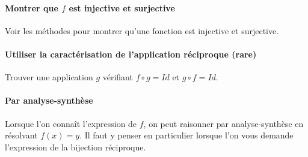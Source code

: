 \documentclass[a4paper, 11pt]{article}
\begin{document}
\paragraph{Montrer que $f$ est injective et surjective}


Voir les m\'ethodes pour montrer qu'une fonction est injective et surjective.



\paragraph{Utiliser la caract\'erisation de l'application r\'eciproque (rare)}


Trouver une application $g$ v\'erifiant $f\circ g=Id$ et $g\circ f=Id$.


% 
%
%



\paragraph{Par analyse-synth\`ese}

Lorsque l'on conna\^it l'expression de $f$, on peut raisonner par analyse-synth\`ese en r\'esolvant $f(x)=y$. Il faut y penser en particulier lorsque l'on vous demande l'expression de la bijection r\'eciproque.\\
\end{document}
